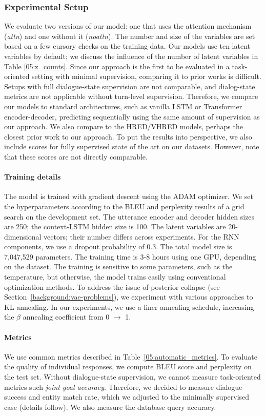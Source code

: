 \subsubsection{Experimental Setup}
\label{05:sec:expe_setup}
We evaluate two versions of our model: one that uses the attention mechanism (\emph{attn}) and one without it (\emph{noattn}). The number and size of the variables are set based on a few cursory checks on the training data. Our models use ten latent variables by default; we discuss the influence of the number of latent variables in Table \ref{05:z_counts}.
Since our approach is the first to be evaluated in a task-oriented setting with minimal supervision, comparing it to prior works is difficult. Setups with full dialogue-state supervision are not comparable, and dialog-state metrics are not applicable without turn-level supervision. Therefore, we compare our models to standard architectures, such as vanilla LSTM or Transformer encoder-decoder, predicting sequentially using the same amount of supervision as our approach. We also compare to the HRED/VHRED models, perhaps the closest prior work to our approach. To put the results into perspective, we also include scores for fully supervised state of the art on our datasets.
However, note that these scores are not directly comparable.

\paragraph{Training details}
The model is trained with gradient descent using the ADAM optimizer.
We set the hyperparameters according to the BLEU and perplexity results of a grid search on the development set.
The utterance encoder and decoder hidden sizes are 250; the context-LSTM hidden size is 100.
The latent variables are 20-dimensional vectors; their number differs across experiments.
For the RNN components, we use a dropout probability of $0.3$.
The total model size is 7,047,529 parameters.
The training time is 3-8 hours using one GPU, depending on the dataset.
The training is sensitive to some parameters, such as the  temperature, but otherwise, the model trains easily using conventional optimization methods.
To address the issue of posterior collapse (see Section~\ref{background:vae-problems}), we experiment with various approaches to KL annealing.
In our experiments, we use a liner annealing schedule, increasing the $\beta$ annealing coefficient from 0 $\rightarrow$ 1.
\paragraph{Metrics}
We use common metrics described in Table~\ref{05:automatic_metrics}.
To evaluate the quality of individual responses, we compute BLEU score and perplexity on the test set.
Without dialogue-state supervision, we cannot measure task-oriented metrics such \emph{joint goal accuracy}.
Therefore, we decided to measure dialogue success and entity match rate, which we adjusted to the minimally supervised case (details follow).
We also measure the database query accuracy.


